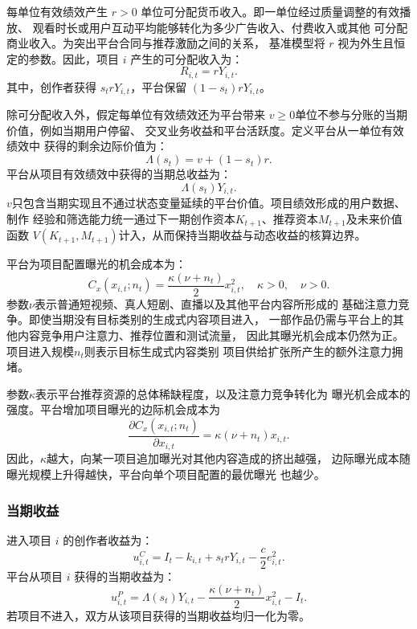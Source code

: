 \documentclass[UTF8, a4paper, 12pt, fontset=fandol]{ctexart}
\theoremstyle{definition}
\theoremstyle{remark}
\begin{document}
每单位有效绩效产生 $r>0$ 单位可分配货币收入。即一单位经过质量调整的有效播放、
观看时长或用户互动平均能够转化为多少广告收入、付费收入或其他
可分配商业收入。为突出平台合同与推荐激励之间的关系，
基准模型将 $r$ 视为外生且恒定的参数。因此，项目 $i$ 
产生的可分配收入为：
\begin{equation*}
  R_{i,t}=rY_{i,t}.
\end{equation*}
其中，创作者获得 $s_t r Y_{i,t}$，平台保留 $(1-s_t)rY_{i,t}$。

除可分配收入外，假定每单位有效绩效还为平台带来
$v\geq 0$单位不参与分账的当期价值，例如当期用户停留、
交叉业务收益和平台活跃度。定义平台从一单位有效绩效中
获得的剩余边际价值为：
\begin{equation*}
  \Lambda(s_t) = v + (1-s_t)r.
\end{equation*}
平台从项目有效绩效中获得的当期总收益为：
\begin{equation*}
  \Lambda(s_t)Y_{i,t}.
\end{equation*}
$v$只包含当期实现且不通过状态变量延续的平台价值。项目绩效形成的用户数据、制作
经验和筛选能力统一通过下一期创作资本$K_{t+1}$、推荐资本$M_{t+1}$及未来价值函数
$V(K_{t+1},M_{t+1})$计入，从而保持当期收益与动态收益的核算边界。

平台为项目配置曝光的机会成本为：
\begin{equation*}
  C_x(x_{i,t};n_t) = \frac{\kappa (\nu + n_t)}{2}x_{i,t}^2,
  \quad \kappa>0,
  \quad \nu>0.
\end{equation*}
参数$\nu$表示普通短视频、真人短剧、直播以及其他平台内容所形成的
基础注意力竞争。即使当期没有目标类别的生成式内容项目进入，
一部作品仍需与平台上的其他内容竞争用户注意力、推荐位置和测试流量，
因此其曝光机会成本仍然为正。项目进入规模$n_t$则表示目标生成式内容类别
项目供给扩张所产生的额外注意力拥堵。

参数$\kappa$表示平台推荐资源的总体稀缺程度，以及注意力竞争转化为
曝光机会成本的强度。平台增加项目曝光的边际机会成本为
\begin{equation*}
  \frac{\partial C_x(x_{i,t};n_t)}
  {\partial x_{i,t}}
  =
  \kappa(\nu+n_t)x_{i,t}.
\end{equation*}
因此，$\kappa$越大，向某一项目追加曝光对其他内容造成的挤出越强，
边际曝光成本随曝光规模上升得越快，平台向单个项目配置的最优曝光
也越少。
\subsubsection{当期收益}
进入项目 $i$ 的创作者收益为：
\begin{equation*}
  u_{i,t}^C = I_t - k_{i,t} + s_t r Y_{i,t} - \frac{c}{2}e_{i,t}^2.
\end{equation*}
平台从项目 $i$ 获得的当期收益为：
\begin{equation*}
  u_{i,t}^P = \Lambda(s_t)Y_{i,t} - \frac{\kappa (\nu + n_t)}{2}x_{i,t}^2 - I_t.
\end{equation*}
若项目不进入，双方从该项目获得的当期收益均归一化为零。
\end{document}
